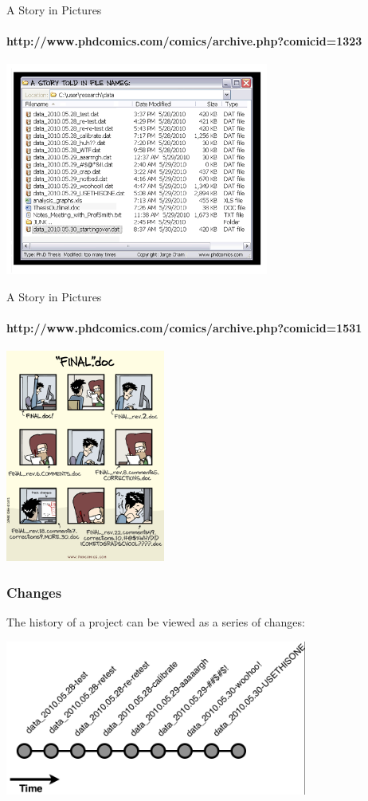   \begin{frame}[t]{A Story in Pictures}
    \framesubtitle{http://www.phdcomics.com/comics/archive.php?comicid=1323} 
    \begin{center}
      \includegraphics[height=2.75in]{../images/phd052810s.png} 
    \end{center}
  \end{frame}

  \begin{frame}[t]{A Story in Pictures}
    \framesubtitle{http://www.phdcomics.com/comics/archive.php?comicid=1531} 
    \begin{center}
      \includegraphics[height=2.75in]{../images/phd101212s.png} 
    \end{center}
  \end{frame}

  \begin{frame}[t]
    \frametitle{Changes}
    The history of a project can be viewed as a series of changes:
    \begin{center}
      \includegraphics[height=2.00in]{../images/from-wickham-01.png} 
    \end{center} 
  \end{frame}

